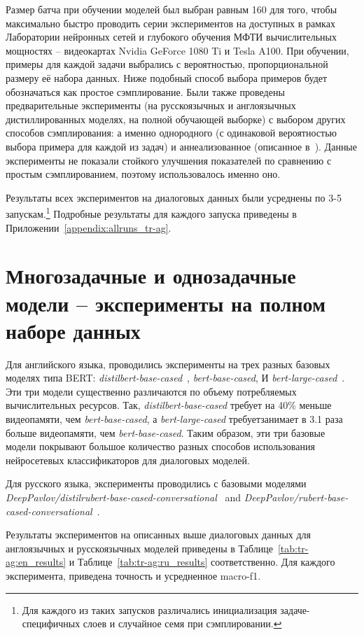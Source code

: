 Размер батча при обучении моделей был выбран равным 160 для того, чтобы максимально быстро проводить серии экспериментов на доступных в рамках Лаборатории нейронных сетей и глубокого обучения МФТИ вычислительных мощностях -- видеокартах Nvidia GeForce 1080 Ti и Tesla A100.
При обучении, примеры для каждой задачи выбрались с вероятностью, пропорциональной размеру её набора данных. Ниже подобный способ выбора примеров будет обозначаться как простое сэмплирование. Были также проведены предварительные эксперименты (на русскоязычных и англоязычных дистиллированных моделях, на полной обучающей выборке) с выбором других способов сэмплирования: а именно однородного (с одинаковой вероятностью выбора примера для каждой из задач) и аннеализованное (описанное в~\cite{stickland_2019}). Данные эксперименты не показали стойкого улучшения показателей по сравнению с простым сэмплированием, поэтому использовалось именно оно. 

Результаты всех экспериментов на диалоговых данных были усреднены по 3-5 запускам.\footnote{Для каждого из таких запусков различались инициализация задаче-специфичных слоев и случайное семя при сэмплировании.} Подробные результаты для каждого запуска приведены в Приложении~\ref{appendix:allruns_tr-ag}.

\section{Многозадачные и однозадачные модели -- эксперименты на полном наборе данных} 
Для английского языка, проводились эксперименты на трех разных базовых моделях типа BERT: \textit{distilbert-base-cased}~\cite{distilbert}, \textit{bert-base-cased}, И \textit{bert-large-cased}~\cite{bert}.  Эти три модели существенно различаются по объему потребляемых вычислительных ресурсов. Так, 
\textit{distilbert-base-cased} требует на 40\% меньше видеопамяти, чем \textit{bert-base-cased}, а \textit{bert-large-cased} требуетзанимает в  3.1 раза больше видеопамяти, чем \textit{bert-base-cased}. Таким образом, эти три базовые модели покрывают большое количество разных способов использования нейросетевых классификаторов для диалоговых моделей. 

Для русского языка, эксперименты проводились с базовыми моделями \textit{DeepPavlov/distilrubert-base-cased-conversational}~\cite{distilrubert} and \textit{DeepPavlov/rubert-base-cased-conversational}~\cite{rubert}.

Результаты экспериментов на описанных выше диалоговых данных для англоязычных и русскоязычных моделей приведены в Таблице~\ref{tab:tr-ag:en_results} и Таблице~\ref{tab:tr-ag:ru_results} соответственно. Для каждого эксперимента, приведена точность и усредненное macro-f1.

